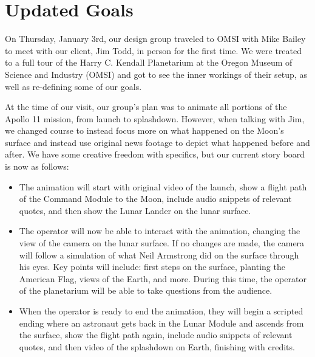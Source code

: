 \documentclass[onecolumn, draftclsnofoot,10pt, compsoc]{IEEEtran}
\begin{document}
\clearpage


\section{Updated Goals}


On Thursday, January 3rd, our design group traveled to OMSI with Mike Bailey to meet with our client, Jim Todd, in person for the first time. We were treated to a full tour of the Harry C. Kendall Planetarium at the Oregon Museum of Science and Industry (OMSI) and got to see the inner workings of their setup, as well as re-defining some of our goals. 

At the time of our visit, our group's plan was to animate all portions of the Apollo 11 mission, from launch to splashdown. However, when talking with Jim, we changed course to instead focus more on what happened on the Moon's surface and instead use original news footage to depict what happened before and after. We have some creative freedom with specifics, but our current story board is now as follows: 

\begin{itemize}
    \item The animation will start with original video of the launch, show a flight path of the Command Module to the Moon, include audio snippets of relevant quotes, and then show the Lunar Lander on the lunar surface.
    
    \item The operator will now be able to interact with the animation, changing the view of the camera on the lunar surface. If no changes are made, the camera will follow a simulation of what Neil Armstrong did on the surface through his eyes. Key points will include: first steps on the surface, planting the American Flag, views of the Earth, and more. During this time, the operator of the planetarium will be able to take questions from the audience. 
    
    \item When the operator is ready to end the animation, they will begin a scripted ending where an astronaut gets back in the Lunar Module and ascends from the surface, show the flight path again, include audio snippets of relevant quotes, and then video of the splashdown on Earth, finishing with credits. 
    
\end{itemize}
\end{document}
